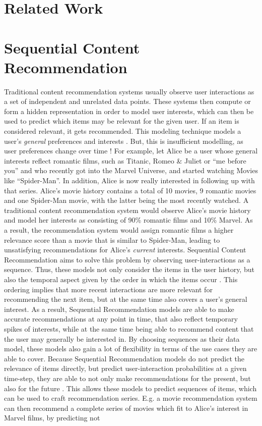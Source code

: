 \documentclass{Academic}
\begin{document}
    \section{Related Work}

    \section{Sequential Content Recommendation}
    Traditional content recommendation systems usually observe user interactions as a set of independent and unrelated data points. These systems then compute or form a hidden representation in order to model user interests, which can then be used to predict which items may be relevant for the given user. If an item is considered relevant, it gets recommended. This modeling technique models a user's \textit{general} preferences and interests \cite{wangSequentialRecommenderSystems2019}. But, this is insufficient modelling, as user preferences change over time \cite{wangSequentialRecommenderSystems2019}! For example, let Alice be a user whose general interests reflect romantic films, such as Titanic, Romeo \& Juliet or \enquote{me before you} and who recently got into the Marvel Universe, and started watching Movies like \enquote{Spider-Man}. In addition, Alice is now really interested in following up with that series. Alice's movie history contains a total of 10 movies, 9 romantic movies and one Spider-Man movie, with the latter being the most recently watched. A traditional content recommendation system would observe Alice's movie history and model her interests as consisting of 90\% romantic films and 10\% Marvel. As a result, the recommendation system would assign romantic films a higher relevance score than a movie that is similar to Spider-Man, leading to unsatisfying recommendations for Alice's \textit{current} interests. Sequential Content Recommendation aims to solve this problem by observing user-interactions as a sequence. Thus, these models not only consider the items in the user history, but also the temporal aspect given by the order in which the items occur \cite{wangSequentialRecommenderSystems2019}. This ordering implies that more recent interactions are more relevant for recommending the next item, but at the same time also covers a user's general interest. As a result, Sequential Recommendation models are able to make accurate recommendations at any point in time, that also reflect temporary spikes of interests, while at the same time being able to recommend content that the user may generally be interested in. By choosing sequences as their data model, these models also gain a lot of flexibility in terms of the use cases they are able to cover. Because Sequential Recommendation models do not predict the relevance of items directly, but predict user-interaction probabilities at a given time-step, they are able to not only make recommendations for the present, but also for the future \cite{wangSequentialRecommenderSystems2019}. This allows these models to predict sequences of items, which can be used to craft recommendation series. E.g. a movie recommendation system can then recommend a complete series of movies which fit to Alice's interest in Marvel films, by predicting not 
\end{document}
